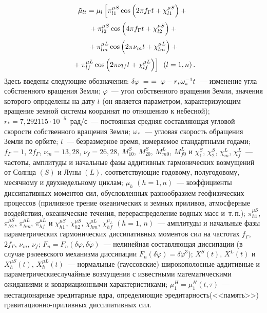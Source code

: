 \begin{multicols}{2}
    \noindent
    \begin{multline}
\tilde\mu_{lt} = \mu_l\left[ \pi_{l1}^{\mu S} \cos\left( 2\pi f_\Gamma t +\chi_{l1}^{\mu S}\right )+{}\right.\\[3pt]
{}+
    \pi_{l2}^{\mu S} \cos\left ( 4\pi f_\Gamma t +\chi_{l2}^{\mu S}\right )+{}\\[3pt]
{}+\pi_{lm}^{\mu L} \cos\left( 2\pi \nu_m t +\chi_{lm}^{\mu L}\right )+{}\\[3pt]
\left. {}+   \pi_{lf}^{\mu L} \cos\left( 2\pi \nu_{lf} t +\chi_{lf}^{\mu L}\right)\right]\enskip (l=1,n)\,.
\label{e3s}
\end{multline}
Здесь введены следующие обозначения: $\delta\varphi\; =$\linebreak $=\;\varphi - r_*
\omega_*^{-1} t$~--- изменение угла собственного вращения Земли; 
$\varphi$~--- угол собственного вращения Земли, значения которого
определены на дату $t$ (он является параметром, характеризующим
вращение земной системы координат по отношению к не\-бе\-сной); $r_* =
7{,}292115 \cdot 10^{-5}$~рад/с~--- постоянная средняя составляющая
угловой скорости собственного вращения Земли; $\omega_*$~---  угловая
скорость обращения Земли по орбите; $t$~--- безразмерное время,
из\-ме\-ря\-емое стандартными годами; $f_\Gamma = 1$, $ 2 f_\Gamma$,
$\nu_m= 13{,}28$, $\nu_f =26{,}28$, $M_{10}^S$, $M_{20}^S$, $M_{m0}^L$,
$M_{f0}^L$ и $\chi_1^S$, $\chi_2^S$, $\chi_m^L$, $\chi_f^L$~---
частоты, амплитуды и начальные фазы аддитивных гармонических
возмущений от Солнца $(S)$ и Луны $(L)$, соответствующие годовому,
полугодовому, месячному и двухнедельному циклам; $\mu_h$ $(h=1,n)$~--- 
коэффициенты диссипативных моментов сил, обуслов\-лен\-ных
разнообразием геофизических процессов (приливное трение океанических
и земных приливов, атмосферные воздействия, океанические течения,
перераспределение водных масс и~т.\,п.); $ \pi_{h1}^{\mu S}$,
$\pi_{h2}^{\mu S}$, $\pi_{hm}^{\mu L}$, $ \pi_{hf}^{\mu L}$ и
$\chi_{h1}^{\mu S}$, $\chi_{h2}^{\mu S}$, $\chi_{hm}^{\mu L}$,
$\chi_{hf}^{\mu_L}$ $(h=1,\,n)$~--- амплитуды и начальные фазы
параметрических гармонических диссипативных моментов сил на частотах
$f_\Gamma$, $2f_\Gamma$, $\nu_m$, $\nu_f$; $F_n=F_n (\delta\varphi,
\delta\dot\varphi)$~--- нелинейная со\-став\-ля\-ющая диссипации (в случае
рэлеевского механизма диссипации $F_n (\delta \dot\varphi)
=\delta\dot\varphi^3$); $X^S (t)$, $ X^L (t)$ и $X_h^{\mu S} (t)$,
$X_h^{\mu L} (t)$~--- нормальные (гауссовские) широкополосные
аддитивные и параметрические\linebreak случайные возмущения с известными
математическими ожиданиями и ковариационными характеристиками;
$\mu_1^H =\mu_1^H(t,\tau)$~--- нестационарные эредитарные ядра,
определяющие эредитарность\linebreak (<<память>>) гравитационно-приливных
диссипативных сил.


\end{multicols}
